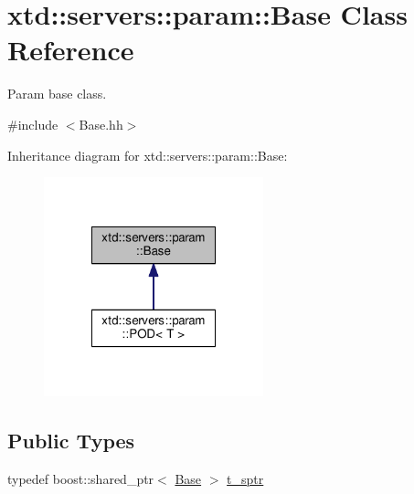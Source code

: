 \hypertarget{classxtd_1_1servers_1_1param_1_1Base}{\section{xtd\-:\-:servers\-:\-:param\-:\-:Base Class Reference}
\label{classxtd_1_1servers_1_1param_1_1Base}
}


Param base class.  




{\ttfamily \#include $<$Base.\-hh$>$}



Inheritance diagram for xtd\-:\-:servers\-:\-:param\-:\-:Base\-:
\nopagebreak
\begin{figure}[H]
\begin{center}
\leavevmode
\includegraphics[width=180pt]{classxtd_1_1servers_1_1param_1_1Base__inherit__graph}
\end{center}
\end{figure}
\subsection*{Public Types}
\begin{DoxyCompactItemize}
\item 
typedef boost\-::shared\-\_\-ptr$<$ \hyperlink{classxtd_1_1servers_1_1param_1_1Base}{Base} $>$ \hyperlink{classxtd_1_1servers_1_1param_1_1Base_aaf4d92eca642f61cb81524096926c6a1}{t\-\_\-sptr}
\end{DoxyCompactItemize}
